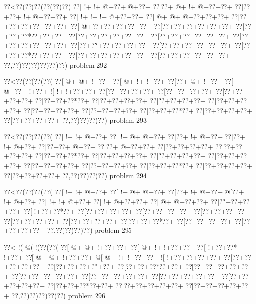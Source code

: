 \vbox{\vbox{\goo
\0??<\0??(\0??(\0??(\0??(\0??(\0??(
\0??[\- !+\- !+\- @+\0??+\- @+\0??+
\0??[\0??+\- @+\- !+\- @+\0??+\0??+
\0??[\0??+\0??+\- !+\- @+\0??+\0??+
\0??[\- !+\- !+\- !+\- @+\0??+\0??+
\0??[\- @+\- @+\- @+\0??+\0??+\0??+
\0??[\0??+\0??+\0??+\0??+\0??+\0??+
\0??[\- @+\0??+\0??+\0??+\0??+\0??+
\0??[\0??+\0??+\0??+\0??+\0??+\0??+
\0??[\0??+\0??+\0??*\0??+\0??+\0??+
\0??[\0??+\0??+\0??+\0??+\0??+\0??+
\0??[\0??+\0??+\0??+\0??+\0??+\0??+
\0??[\0??+\0??+\0??+\0??+\0??+\0??+
\0??[\0??+\0??+\0??+\0??+\0??+\0??+
\0??[\0??+\0??+\0??+\0??+\0??+\0??+
\0??[\0??+\0??+\0??*\0??+\0??+\0??+
\0??[\0??+\0??+\0??+\0??+\0??+\0??+
\0??[\0??+\0??+\0??+\0??+\0??+\0??+
\0??,\0??)\0??)\0??)\0??)\0??)\0??)
}
\hfil problem 292\hfil\break
}

\vbox{\vbox{\goo
\0??<\0??(\0??(\0??(\0??(
\0??[\- @+\- @+\- !+\0??+
\0??[\- @+\- !+\- !+\0??+
\0??[\0??+\- @+\- !+\0??+
\0??[\- @+\0??+\- !+\0??+
\- ![\- !+\- !+\0??+\0??+
\0??[\0??+\0??+\0??+\0??+
\0??[\0??+\0??+\0??+\0??+
\0??[\0??+\0??+\0??+\0??+
\0??[\0??+\0??+\0??*\0??+
\0??[\0??+\0??+\0??+\0??+
\0??[\0??+\0??+\0??+\0??+
\0??[\0??+\0??+\0??+\0??+
\0??[\0??+\0??+\0??+\0??+
\0??[\0??+\0??+\0??+\0??+
\0??[\0??+\0??+\0??*\0??+
\0??[\0??+\0??+\0??+\0??+
\0??[\0??+\0??+\0??+\0??+
\0??,\0??)\0??)\0??)\0??)
}
\hfil problem 293\hfil\break
}

\vbox{\vbox{\goo
\0??<\0??(\0??(\0??(\0??(
\0??[\- !+\- !+\- @+\0??+
\0??[\- !+\- @+\- @+\0??+
\0??[\0??+\- !+\- @+\0??+
\0??[\0??+\- !+\- @+\0??+
\0??[\0??+\0??+\- @+\0??+
\0??[\0??+\- @+\0??+\0??+
\0??[\0??+\0??+\0??+\0??+
\0??[\0??+\0??+\0??+\0??+
\0??[\0??+\0??+\0??*\0??+
\0??[\0??+\0??+\0??+\0??+
\0??[\0??+\0??+\0??+\0??+
\0??[\0??+\0??+\0??+\0??+
\0??[\0??+\0??+\0??+\0??+
\0??[\0??+\0??+\0??+\0??+
\0??[\0??+\0??+\0??*\0??+
\0??[\0??+\0??+\0??+\0??+
\0??[\0??+\0??+\0??+\0??+
\0??,\0??)\0??)\0??)\0??)
}
\hfil problem 294\hfil\break
}

\vbox{\vbox{\goo
\0??<\0??(\0??(\0??(\0??(
\0??[\- !+\- !+\- @+\0??+
\0??[\- !+\- @+\- @+\0??+
\0??[\0??+\- !+\- @+\0??+
\- @[\0??+\- !+\- @+\0??+
\0??[\- !+\- !+\- @+\0??+
\0??[\- !+\- @+\0??+\0??+
\0??[\- @+\- @+\0??+\0??+
\0??[\0??+\0??+\0??+\0??+
\0??[\- !+\0??+\0??*\0??+
\0??[\0??+\0??+\0??+\0??+
\0??[\0??+\0??+\0??+\0??+
\0??[\0??+\0??+\0??+\0??+
\0??[\0??+\0??+\0??+\0??+
\0??[\0??+\0??+\0??+\0??+
\0??[\0??+\0??+\0??*\0??+
\0??[\0??+\0??+\0??+\0??+
\0??[\0??+\0??+\0??+\0??+
\0??,\0??)\0??)\0??)\0??)
}
\hfil problem 295\hfil\break
}

\vbox{\vbox{\goo
\0??<\- !(\- @(\- !(\0??(\0??(
\0??[\- @+\- @+\- !+\0??+\0??+
\0??[\- @+\- !+\- !+\0??+\0??+
\0??[\- !+\0??+\0??*\- !+\0??+
\0??[\- @+\- @+\- !+\0??+\0??+
\- @[\- @+\- !+\- !+\0??+\0??+
\- ![\- !+\0??+\0??+\0??+\0??+
\0??[\0??+\0??+\0??+\0??+\0??+
\0??[\0??+\0??+\0??+\0??+\0??+
\0??[\0??+\0??+\0??*\0??+\0??+
\0??[\0??+\0??+\0??+\0??+\0??+
\0??[\0??+\0??+\0??+\0??+\0??+
\0??[\0??+\0??+\0??+\0??+\0??+
\0??[\0??+\0??+\0??+\0??+\0??+
\0??[\0??+\0??+\0??+\0??+\0??+
\0??[\0??+\0??+\0??*\0??+\0??+
\0??[\0??+\0??+\0??+\0??+\0??+
\0??[\0??+\0??+\0??+\0??+\0??+
\0??,\0??)\0??)\0??)\0??)\0??)
}
\hfil problem 296\hfil\break
}

